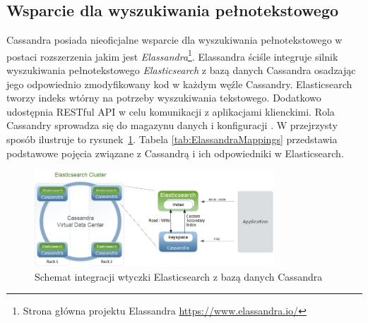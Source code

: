 \subsection{Wsparcie dla wyszukiwania pełnotekstowego}

Cassandra posiada nieoficjalne wsparcie dla wyszukiwania pełnotekstowego w postaci rozszerzenia jakim jest \textit{Elassandra}\footnote{Strona główna projektu Elassandra \url{https://www.elassandra.io/}}.
Elassandra ściśle integruje silnik wyszukiwania pełnotekstowego \textit{Elasticsearch} z bazą danych Cassandra osadzając jego odpowiednio zmodyfikowany kod w każdym węźle Cassandry.
Elasticsearch tworzy indeks wtórny na potrzeby wyszukiwania tekstowego.
Dodatkowo udostępnia RESTful API w celu komunikacji z aplikacjami klienckimi. 
Rola Cassandry sprowadza się do magazynu danych i konfiguracji \cite{elassandraArchitecture}.
W przejrzysty sposób ilustruje to rysunek~\ref{fig:elassandraSchema}.
Tabela \ref{tab:ElassandraMappings} przedstawia podstawowe pojęcia związane z Cassandrą i ich odpowiedniki w Elasticsearch.

\begin{figure}[!ht]
\centering
\includegraphics[width=0.8\textwidth]{figures/elassandra1.jpg}
\caption{Schemat integracji wtyczki Elasticsearch z bazą danych Cassandra \cite{ElassandraRepo}}
\label{fig:elassandraSchema}
\end{figure}

